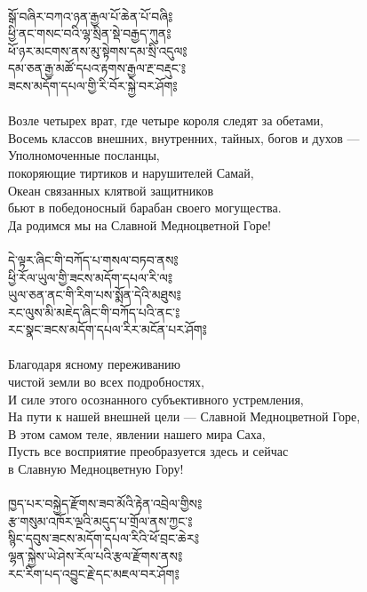 \\
{\ti སྒོ་བཞིར་བཀའ་ཉན་རྒྱལ་པོ་ཆེན་པོ་བཞི༔\\
ཕྱི་ནང་གསང་བའི་ལྷ་སྲིན་སྡེ་བརྒྱད་ཀུན༔\\
ཕོ་ཉར་མངགས་ནས་མུ་སྟེགས་དམ་སྲི་འདུལ༔\\
དམ་ཅན་རྒྱ་མཚོ་དཔའ་རྟགས་རྒྱལ་རྔ་བརྡུང་༔\\
ཟངས་མདོག་དཔལ་གྱི་རི་བོར་སྐྱེ་བར་ཤོག༔}\\
\\
\ru
Возле четырех врат, где четыре короля следят за обетами,\\
Восемь классов внешних, внутренних, тайных, богов и духов —\\
Уполномоченные посланцы, \\ \indent покоряющие тиртиков и нарушителей Самай,\\
Океан связанных клятвой защитников \\ \indent бьют в победоносный барабан своего могущества.\\
Да родимся мы на Славной Медноцветной Горе!\\
\\
\newpage
{\ti དེ་ལྟར་ཞིང་གི་བཀོད་པ་གསལ་བཏབ་ནས༔\\
ཕྱི་རོལ་ཡུལ་གྱི་ཟངས་མདོག་དཔལ་རི་ལ༔\\
ཡུལ་ཅན་ནང་གི་རིག་པས་སྨོན་དེའི་མཐུས༔\\
རང་ལུས་མི་མཇེད་ཞིང་གི་བཀོད་པའི་ནང་༔\\
རང་སྣང་ཟངས་མདོག་དཔལ་རིར་མངོན་པར་ཤོག༔}\\
\\
\ru
Благодаря ясному переживанию \\ \indent чистой земли во всех подробностях,\\
И силе этого осознанного субъективного устремления,\\
На пути к нашей внешней цели — Славной Медноцветной Горе,\\
В этом самом теле, явлении нашего мира Саха,\\
Пусть все восприятие преобразуется здесь и сейчас \\ \indent в Славную Медноцветную Гору!\\
\\
{\ti ཁྱད་པར་བསྐྱེད་རྫོགས་ཟབ་མོའི་རྟེན་འབྲེལ་གྱིས༔\\
རྩ་གསུམ་འཁོར་ལྔའི་མདུད་པ་གྲོལ་ནས་ཀྱང་༔\\
སྙིང་དབུས་ཟངས་མདོག་དཔལ་རིའི་ཕོ་བྲང་ཆེར༔\\
ལྷན་སྐྱེས་ཡེ་ཤེས་རོལ་པའི་རྩལ་རྫོགས་ནས༔\\
རང་རིག་པད་འབྱུང་རྗེ་དང་མཇལ་བར་ཤོག༔}\\
